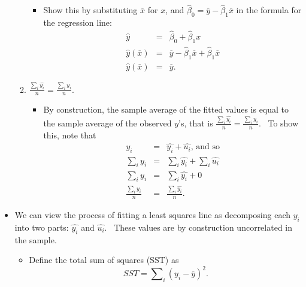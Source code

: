 \documentclass[11pt]{article}
\begin{document}
\begin{itemize}
\begin{enumerate}
\begin{itemize}
\item Show this by substituting $\overline{x}$ for $x$, and $\widehat{\beta }%
_{0}=\overline{y}-\widehat{\beta }_{1}\overline{x}$ in the formula for the
regression line:%
\begin{eqnarray*}
\widehat{y} &=&\widehat{\beta }_{0}+\widehat{\beta }_{1}x \\
\widehat{y}\left( \overline{x}\right) &=&\overline{y}-\widehat{\beta }_{1}%
\overline{x}+\widehat{\beta }_{1}\overline{x} \\
\widehat{y}\left( \overline{x}\right) &=&\overline{y}.
\end{eqnarray*}
\end{itemize}

\item $\frac{\sum\nolimits_{i}\widehat{y_{i}}}{n}=\frac{\sum%
\nolimits_{i}y_{i}}{n}.$

\begin{itemize}
\item By construction, the sample average of the fitted values is equal to
the sample average of the observed $y$'s, that is $\frac{\sum\nolimits_{i}%
\widehat{y_{i}}}{n}=\frac{\sum\nolimits_{i}y_{i}}{n}.$ \ To show this, note
that%
\begin{eqnarray*}
y_{i} &=&\widehat{y_{i}}+\widehat{u_{i}}\text{, and so} \\
\sum\nolimits_{i}y_{i} &=&\sum\nolimits_{i}\widehat{y_{i}}+\sum\nolimits_{i}%
\widehat{u_{i}} \\
\sum\nolimits_{i}y_{i} &=&\sum\nolimits_{i}\widehat{y_{i}}+0 \\
\frac{\sum\nolimits_{i}y_{i}}{n} &=&\frac{\sum\nolimits_{i}\widehat{y_{i}}}{n%
}.
\end{eqnarray*}
\end{itemize}
\end{enumerate}

\item We can view the process of fitting a least squares line as decomposing
each $y_{i}\ $into two parts: $\widehat{y_{i}}$ and $\widehat{u_{i}}.$ \
These values are by construction uncorrelated in the sample.

\begin{itemize}
\item Define the total sum of squares (SST) as%
\begin{equation*}
SST=\sum\nolimits_{i}\left( y_{i}-\overline{y}\right) ^{2}.
\end{equation*}


\end{itemize}
\end{itemize}
\end{document}
